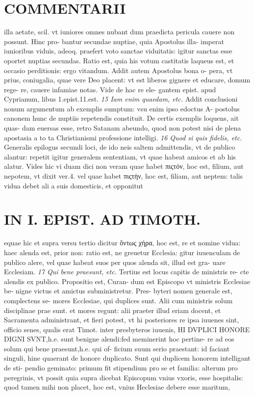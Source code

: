 \documentclass{article}
\begin{document}
\begin{pages}
\section*{COMMENTARII }
\marginpar{[ p.130 ]}\pstart illa aetate, scil. vt iuniores omnes nubant dum praedicta pericula cauere non possunt. Hinc pro- bantur secundae nuptiae, quia Apostolus illa- imperat iunioribus  viduis, adeoq. praefert voto sanctae viduitatis: igitur sanctas esse oportet nuptias secundas. Ratio est, quia his votum castitatis laqueus est, et occasio perditionis: ergo vitandum. Addit autem Apostolus bona o- pera, vt prius, coniugalia, quae vere Deo placent: vt est liberos gignere et educare, domum rege- re, cauere infamiae notas. Vide de hac re ele- gantem epist. apud Cyprianum, libus 1.epist.11.est.  \pend
\textit{15 Iam enim quaedam, etc. }\pstart Addit conclusioni nonum argumentum ab exemplis sumptum: vsu enim ipso edoctus A- postolus canonem hunc de nuptiis repetendis constituit. De certis exemplis loquens, ait quas- dam euersas esse, retro Satanam abeundo, quod non potest nisi de plena apostasia a to ta Christianismi professione intelligi.  \pend
\textit{16 Quod si quis fidelis, etc. }\pstart Generalis epilogus secundi loci, de ido neis saltem admittendis, vt de publico alantur: repetit igitur generalem sententiam, vt quae habeat amicos et ab his alatur. Vides hic vi duam dici non veram quae habet πιςτόν, hoc est, filium, aut nepotem, vt dixit ver.4. vel quae habet πιςτὴν, hoc est, filiam, aut neptem: talis vidua debet ali a suis domesticis, et opponitut  \pend
\section*{IN I. EPIST. AD TIMOTH. }
\marginpar{[ p.131 ]}\pstart equae hic et supra versu tertio dicitur ὄντως χήρα, hoc est, re et nomine vidua: haec alenda est, prior non: ratio est, ne greuetur Ecclesia: gitur iuuenculam de publico alere, vel quae habeat suos per quos alenda sit, illud est gra- uare Ecclesiam.  \pend
\textit{17 Qui bene praesunt, etc. }\pstart Tertius est locus capitis de ministris re- cte alendis ex publico. Propositio est, Curan- dum est Episcopo vt ministris Ecclesiae be- nigne victus et amictus subministretur. Pres- byteri nomen generale est, complectens se- mores Ecclesiae, qui duplices sunt.  \pend\pstart Alii cum ministris solum disciplinae prae sunt. et mores regunt: alii praeter illud eriam docent, et Sacramenta administrant, et fieri potest, vt hi posteriores re ipsa iuuenes sint, officio senes, qualis erat Timot. inter presbyteros iuuenis, HI DVPLICI HONORE DIGNI SVNT,h.e. sunt benigne alendi:fed meminerint hoc pertine- re ad eos solum qui bene praesunt,h.e. qui of- ficium suum serio praestant: id faciant singuli, hine quaerant de honore duplicato.  \pend\pstart Sunt qui duplicem honorem intelligant de sti- pendio geminato: primum fit stipendium pro se et familia: alterum pro peregrinis, vt possit quia supra dicebat Episcopum vnius vxoris, esse hospitalis: quod tamen mihi non placet, hoc est, vnius Heclesiae debere esse maritum,  \pend

\end{pages}
\end{document}
